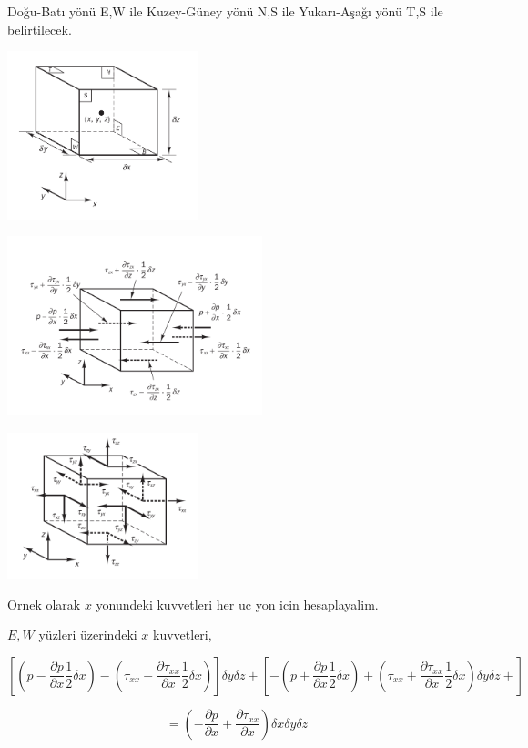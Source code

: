 Doğu-Batı yönü E,W ile Kuzey-Güney yönü N,S ile Yukarı-Aşağı yönü T,S
ile belirtilecek. 

\includegraphics[width=15em]{phy_030_fluid2_03.png}

\includegraphics[width=20em]{phy_030_fluid2_01.png}

\includegraphics[width=15em]{phy_030_fluid2_02.png}


Ornek olarak $x$ yonundeki kuvvetleri her uc yon icin hesaplayalim.

$E,W$ yüzleri üzerindeki $x$ kuvvetleri, 

$$
\left[
  \left( p - \frac{\partial p}{\partial x} \frac{1}{2} \delta x \right) -
  \left( \tau_{xx} - \frac{\partial \tau_{xx}}{\partial x} \frac{1}{2} \delta x \right) 
\right]
  \delta y \delta z  +
\left[
  -\left( p + \frac{\partial p}{\partial x} \frac{1}{2} \delta x \right) +
  \left( \tau_{xx} + \frac{\partial \tau_{xx}}{\partial x} \frac{1}{2} \delta x \right) 
  \delta y \delta z  +  
\right]
$$

$$
= \left(
-\frac{\partial p}{\partial x} + \frac{\partial \tau_{xx}}{\partial x}
\right)
\delta x \delta y \delta z
$$

